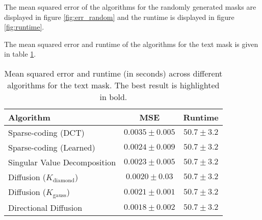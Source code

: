 The mean squared error of the algorithms for the randomly generated masks are displayed in figure \ref{fig:err_random} and the runtime is displayed in figure \ref{fig:runtime}.

The mean squared error and runtime of the algorithms for the text mask is given in table \ref{tbl:err_text}.



\begin{table}
	\centering
	\begin{tabular}{|l|c|c|}
		\hline
		\textbf{Algorithm} & \textbf{MSE} & \textbf{Runtime} \\ \hline \hline
		Sparse-coding (DCT) & $0.0035 \pm 0.005$ & $50.7 \pm 3.2$ \\ \hline
		Sparse-coding (Learned) & $0.0024 \pm 0.009$ & $50.7 \pm 3.2$ \\ \hline
		Singular Value Decomposition & $0.0023 \pm 0.005$ & $50.7 \pm 3.2$ \\ \hline
		Diffusion ($K_{\text{diamond}}$) & $0.0020 \pm 0.03$ & $50.7 \pm 3.2$ \\ \hline
		Diffusion ($K_{\text{gauss}}$) & $0.0021 \pm 0.001$ & $50.7 \pm 3.2$ \\ \hline
		Directional Diffusion & $\mathbf{0.0018} \pm 0.002$ & $50.7 \pm 3.2$ \\ \hline
	\end{tabular}
	\caption{Mean squared error and runtime (in seconds) across different algorithms for the text mask. The best result is highlighted in bold.}
	\label{tbl:err_text}
\end{table}

